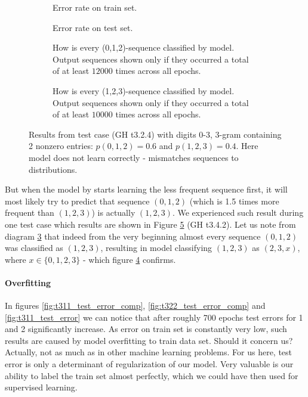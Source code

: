 \documentclass[declaration,shortabstract,lic,english]{iithesis}
\begin{document}
\begin{figure}[htb]
\begin{subfigure}[b]{.49\textwidth}
    \def\svgwidth{\textwidth}
    
    \caption{Error rate on train set.}
    \label{fig:t342_data_error}
\end{subfigure}
\begin{subfigure}[b]{.49\textwidth}
    \def\svgwidth{\textwidth}
    
    \caption{Error rate on test set.}
    \label{fig:t342_test_error}
\end{subfigure}
\begin{subfigure}[b]{.49\textwidth}
    \def\svgwidth{\textwidth}
    
    \caption{How is every (0,1,2)-sequence classified by model. Output sequences shown only if they occurred a total
    of at least $12000$ times across all epochs.}
    \label{fig:t342_predictions_012}
\end{subfigure}
\begin{subfigure}[b]{.49\textwidth}
    \def\svgwidth{\textwidth}
    
    \caption{How is every (1,2,3)-sequence classified by model. Output sequences shown only if they occurred a total
    of at least $10000$ times across all epochs.}
    \label{fig:t342_predictions_123}
\end{subfigure}
\caption{Results from test case (GH t3.2.4) with digits 0-3, 3-gram containing 2 nonzero entries: $p(0,1,2)=0.6$ and $p(1, 2, 3)=0.4$. Here model does not learn correctly - mismatches sequences to distributions.}
\label{fig:t342_results}
\end{figure}

But when the model by starts learning the less frequent sequence first, it will most likely try to predict that sequence $(0, 1, 2)$ (which is 1.5 times more frequent than $(1, 2, 3)$) is actually $(1, 2, 3)$. We experienced such result during one test case which results are shown in Figure \ref{fig:t342_results} (GH t3.4.2). Let us note from diagram \ref{fig:t342_predictions_012} that indeed from the very beginning almost every sequence $(0,1,2)$ was classified as $(1, 2, 3)$, resulting in model classifying $(1, 2, 3)$ as $(2, 3, x)$, where $x \in \lbrace0, 1, 2, 3\rbrace$ - which figure \ref{fig:t342_predictions_123} confirms. 

\paragraph{Overfitting} In figures \ref{fig:t311_test_error_comp}, \ref{fig:t322_test_error_comp} and \ref{fig:t311_test_error} we can notice that after roughly 700 epochs test errors for 1 and 2 significantly increase. As error on train set is constantly very low, such results are caused by model overfitting to train data set. Should it concern us? Actually, not as much as in other machine learning problems. For us here, test error is only a determinant of regularization of our model. Very valuable is our ability to label the train set almost perfectly, which we could have then used for supervised learning.
\end{document}

